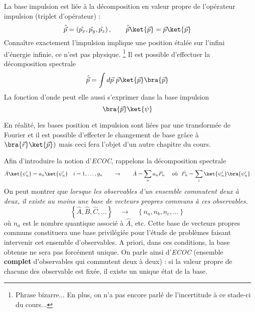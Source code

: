 La base impulsion est liée à la décomposition en valeur propre de l'opérateur 
impulsion (triplet d'opérateur) :
\begin{equation}
\hat{\vec{p}} = \left(\hat{p_x},\hat{p_y},\hat{p_z}\right),\qquad \hat{
\vec{p}}\ket{\vec{p}} = \vec{p}\ket{\vec{p}}
\end{equation}
Connaître exactement l'impulsion implique une position étalée sur l'infini 
d'énergie infinie, ce n'est pas physique.
\footnote{Phrase bizarre... En plus, on n'a pas encore parlé de l'incertitude
à ce stade-ci du cours...} 
Il est possible d'effectuer la décomposition spectrale
\begin{equation}
\hat{\vec{p}} = \int d\vec{p}\ \vec{p} \ket{\vec{p}}\bra{\vec{p}}
\end{equation}
La fonction d'onde peut elle aussi s'exprimer dans la base impulsion
\begin{equation}
\bra{\vec{p}}\ket{\psi}
\end{equation}

En réalité, les bases position et impulsion sont liées par une transformée de Fourier
et il est possible d'effecter le changement de base grâce à $\bra{\vec{r}}\ket{
\vec{p}})$ mais ceci fera l'objet d'un autre chapitre du cours.

Afin d'introduire la notion d'\textit{ECOC}, rappelons la décomposition spectrale
\begin{equation}
\hat{A}\ket{\psi_n'} = a_n\ket{\psi_n'}\quad i=1,\dots,g_n\qquad\rightarrow\qquad
\hat{A} = \sum_na_n\hat{P_n}\quad\text{ où }\ \hat{P_n}=\sum_i\ket{\psi_n^i}\bra{
\psi_n^i}
\end{equation}
On peut montrer que \textit{lorsque les observables d'un ensemble commutent
deux à deux, il existe au moins une base de vecteurs propres communs à ces observables.} 
\begin{equation}
\left\{\hat{A},\hat{B},\hat{C},\dots\right\}\quad\rightarrow\quad \left\{n_a,
n_b,n_c,\dots\right\}
\end{equation}
où $n_a$ est le nombre quantique associé à $\hat{A}$, etc. Cette base de vecteurs
propres communs constituera une base privilégiée pour l'étude de problèmes
faisant intervenir cet ensemble d'observables. A priori, dans ces conditions,
la base obtenue ne sera pas forcément unique. On parle ainsi d'\textit{ECOC} 
(ensemble \textbf{complet} d'observables qui commutent deux à deux) : si la 
valeur propre de chacune des observable est fixée, il existe un unique état de 
la base. \\

